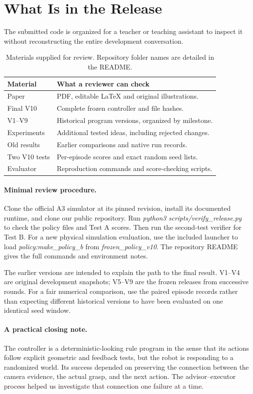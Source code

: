 \section{What Is in the Release}
\label{app:files}
The submitted code is organized for a teacher or teaching assistant to inspect it without reconstructing the entire development conversation.

\begin{table}[t]
\centering\small
\caption{Materials supplied for review. Repository folder names are detailed in the README.}
\label{tab:paths}
\begin{tabular}{p{1.78cm}p{5.9cm}}
\toprule
Material & What a reviewer can check\\
\midrule
Paper & PDF, editable LaTeX and original illustrations.\\
Final V10 & Complete frozen controller and file hashes.\\
V1--V9 & Historical program versions, organized by milestone.\\
Experiments & Additional tested ideas, including rejected changes.\\
Old results & Earlier comparisons and native run records.\\
Two V10 tests & Per-episode scores and exact random seed lists.\\
Evaluator & Reproduction commands and score-checking scripts.\\
\bottomrule
\end{tabular}
\end{table}

\paragraph{Minimal review procedure.}
Clone the official A3 simulator at its pinned revision, install its documented runtime, and clone our public repository. Run \emph{python3 scripts/verify\_release.py} to check the policy files and Test A scores. Then run the second-test verifier for Test B. For a new physical simulation evaluation, use the included launcher to load \emph{policy:make\_policy\_b} from \emph{frozen\_policy\_v10}. The repository README gives the full commands and environment notes.

The earlier versions are intended to explain the path to the final result. V1--V4 are original development snapshots; V5--V9 are the frozen releases from successive rounds. For a fair numerical comparison, use the paired episode records rather than expecting different historical versions to have been evaluated on one identical seed window.

\paragraph{A practical closing note.}
The controller is a deterministic-looking rule program in the sense that its actions follow explicit geometric and feedback tests, but the robot is responding to a randomized world. Its success depended on preserving the connection between the camera evidence, the actual grasp, and the next action. The advisor--executor process helped us investigate that connection one failure at a time.
